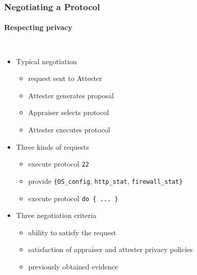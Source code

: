 \documentclass{beamer}
\def \app {App}
\def \att {Att}
\begin{document}
\begin{frame}[fragile]
  \frametitle{Negotiating a Protocol}
  \framesubtitle{Respecting privacy}
  \begin{columns}[c]
    \begin{itemize}
    \item Typical negotiation
      \begin{itemize}
      \item request sent to Attester
      \item Attester generates proposal
      \item Appraiser selects protocol
      \item Attester executes protocol
      \end{itemize}
    \item Three kinds of requests
      \begin{itemize}
      \item execute protocol \verb+22+
      \item provide \verb+{OS_config+, \verb+http_stat+, \verb+firewall_stat}+
      \item execute protocol \verb+do { ... }+
      \end{itemize}
    \item Three negotiation criteria
      \begin{itemize}
      \item ability to satisfy the request
      \item satisfaction of appraiser and attester privacy policies
      \item previously obtained evidence
      \end{itemize}
    \end{itemize}
    \begin{small}
\end{small}
\end{columns}
\end{frame}
\end{document}
